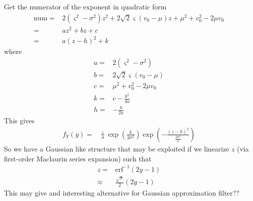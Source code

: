 \documentclass{article}
\begin{document}
Get the numerator of the exponent in quadratic form
\begin{align}
	\mathrm{num} =& 2\left(\varsigma^2 - \sigma^2\right)z^2 + 2\sqrt{2}\varsigma\left(v_0-\mu\right)z + \mu^2 + v_0^2 - 2\mu v_0 \\
	=& az^2 + bz + c \\
	=& a\left(z-h\right)^2 + k
\end{align}
where
\begin{align}
	a =& 2\left(\varsigma^2 - \sigma^2\right) \nonumber \\
	b =& 2\sqrt{2}\varsigma\left(v_0-\mu\right) \nonumber \\
	c =& \mu^2 + v_0^2 - 2\mu v_0 \nonumber \\
	k =& c - \frac{b^2}{4a}\nonumber \\
	h =& - \frac{b}{2a}\nonumber
\end{align}
This gives
\begin{align}
	f_Y(y)=& \frac{\varsigma}{\sigma}\exp\left(\frac{k}{2\sigma^2}\right)\exp\left(-\frac{ (z - h)^2}{\frac{2\sigma^2}{a}}\right)
\end{align}
So we have a Gaussian like structure that may be exploited if we linearize $z$ (via first-order Maclaurin series expansion) such that
\begin{align}
	z =& \mathrm{erf}^{-1}\left(2y-1\right) \\
	\approx& \frac{\sqrt{\pi}}{2}\left(2y-1\right)
\end{align}
This may give and interesting alternative for Gaussian approximation filter??
\end{document}

